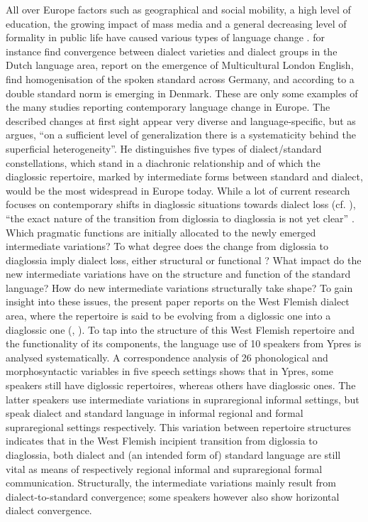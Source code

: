 \documentclass[output=paper]{LSP/langsci}
\begin{document}
All over Europe factors such as geographical and social mobility, a high level of education, the growing impact of mass media and a general decreasing level of formality in public life have caused various types of language change \citep[355]{taeldeman_linguistic_2009}. \citet{heeringa_convergence_2014} for instance find convergence between dialect varieties and dialect groups in the Dutch language area, \citet{cheshire_contact_2011} report on the emergence of Multicultural London English, \citet{auer_demotisation_2011} find homogenisation of the spoken standard across Germany, and according to \citet{kristiansen_two_2001} a double standard norm is emerging in Denmark. These are only some examples of the many studies reporting contemporary language change in Europe. The described changes at first sight appear very diverse and language-specific, but as \citet[7]{auer_europes_2005} argues, “on a sufficient level of generalization there is a systematicity behind the superficial heterogeneity”. He distinguishes five types of dialect/standard constellations, which stand in a diachronic relationship and of which the diaglossic repertoire, marked by intermediate forms between standard and dialect, would be the most widespread in Europe today. While a lot of current research focuses on contemporary shifts in diaglossic situations towards dialect loss (cf. \citealt{ghyselen_impact_2013,grondelaers_standard_2011,vandekerckhove_dialect_2009}), “the exact nature of the transition from diglossia to diaglossia is not yet clear” \citep[23]{auer_europes_2005}. Which pragmatic functions are initially allocated to the newly emerged intermediate variations? To what degree does the change from diglossia to diaglossia imply dialect loss, either structural or functional \citep{auer_convergence_1996}? What impact do the new intermediate variations have on the structure and function of the standard language? How do new intermediate variations structurally take shape? To gain insight into these issues, the present paper reports on the West Flemish dialect area, where the repertoire is said to be evolving from a diglossic one into a diaglossic one (\citealt{de_caluwe_tussentaal_2009}, \citealt[272]{willemyns_-standardization_2007}). To tap into the structure of this West Flemish repertoire and the functionality of its components, the language use of 10 speakers from Ypres is analysed systematically. A correspondence analysis of 26 phonological and morphosyntactic variables in five speech settings shows that in Ypres, some speakers still have diglossic repertoires, whereas others have diaglossic ones. The latter speakers use intermediate variations in supraregional informal settings, but speak dialect and standard language in informal regional and formal supraregional settings respectively. This variation between repertoire structures indicates that in the West Flemish incipient transition from diglossia to diaglossia, both dialect and (an intended form of) standard language are still vital as means of respectively regional informal and supraregional formal communication. Structurally, the intermediate variations mainly result from dialect-to-standard convergence; some speakers however also show horizontal dialect convergence.
\end{document}
